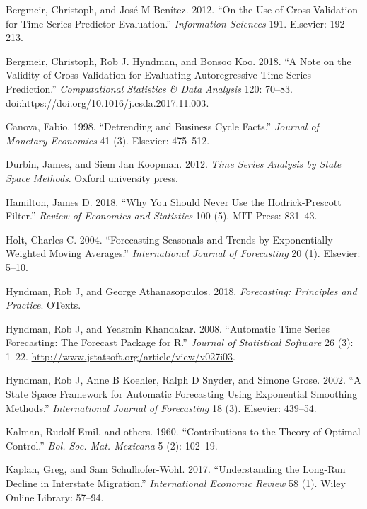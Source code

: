 \documentclass[]{article}
\begin{document}
\hypertarget{refs}{}
\hypertarget{ref-bergmeir2012use}{}
Bergmeir, Christoph, and José M Benítez. 2012. ``On the Use of
Cross-Validation for Time Series Predictor Evaluation.''
\emph{Information Sciences} 191. Elsevier: 192--213.

\hypertarget{ref-bergmeir2018}{}
Bergmeir, Christoph, Rob J. Hyndman, and Bonsoo Koo. 2018. ``A Note on
the Validity of Cross-Validation for Evaluating Autoregressive Time
Series Prediction.'' \emph{Computational Statistics \& Data Analysis}
120: 70--83.
doi:\href{https://doi.org/https://doi.org/10.1016/j.csda.2017.11.003}{https://doi.org/10.1016/j.csda.2017.11.003}.

\hypertarget{ref-canova1998detrending}{}
Canova, Fabio. 1998. ``Detrending and Business Cycle Facts.''
\emph{Journal of Monetary Economics} 41 (3). Elsevier: 475--512.

\hypertarget{ref-durbin2012time}{}
Durbin, James, and Siem Jan Koopman. 2012. \emph{Time Series Analysis by
State Space Methods}. Oxford university press.

\hypertarget{ref-hamilton2018}{}
Hamilton, James D. 2018. ``Why You Should Never Use the Hodrick-Prescott
Filter.'' \emph{Review of Economics and Statistics} 100 (5). MIT Press:
831--43.

\hypertarget{ref-holt2004forecasting}{}
Holt, Charles C. 2004. ``Forecasting Seasonals and Trends by
Exponentially Weighted Moving Averages.'' \emph{International Journal of
Forecasting} 20 (1). Elsevier: 5--10.

\hypertarget{ref-hyndman2018forecasting}{}
Hyndman, Rob J, and George Athanasopoulos. 2018. \emph{Forecasting:
Principles and Practice}. OTexts.

\hypertarget{ref-hyndman2019}{}
Hyndman, Rob J, and Yeasmin Khandakar. 2008. ``Automatic Time Series
Forecasting: The Forecast Package for R.'' \emph{Journal of Statistical
Software} 26 (3): 1--22.
\url{http://www.jstatsoft.org/article/view/v027i03}.

\hypertarget{ref-hyndman2002state}{}
Hyndman, Rob J, Anne B Koehler, Ralph D Snyder, and Simone Grose. 2002.
``A State Space Framework for Automatic Forecasting Using Exponential
Smoothing Methods.'' \emph{International Journal of Forecasting} 18 (3).
Elsevier: 439--54.

\hypertarget{ref-kalman1960contributions}{}
Kalman, Rudolf Emil, and others. 1960. ``Contributions to the Theory of
Optimal Control.'' \emph{Bol. Soc. Mat. Mexicana} 5 (2): 102--19.

\hypertarget{ref-kaplan2017understanding}{}
Kaplan, Greg, and Sam Schulhofer-Wohl. 2017. ``Understanding the
Long-Run Decline in Interstate Migration.'' \emph{International Economic
Review} 58 (1). Wiley Online Library: 57--94.
\end{document}
